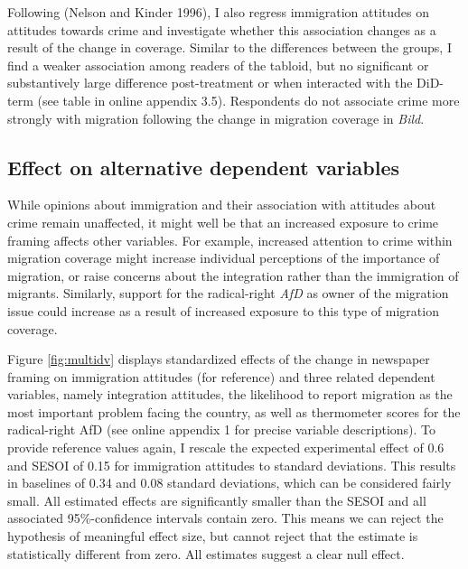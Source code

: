 \documentclass[
  12pt,
]{article}
\begin{document}
Following (Nelson and Kinder 1996), I also regress immigration attitudes on attitudes towards crime and investigate whether this association changes as a result of the change in coverage. Similar to the differences between the groups, I find a weaker association among readers of the tabloid, but no significant or substantively large difference post-treatment or when interacted with the DiD-term (see table in online appendix 3.5). Respondents do not associate crime more strongly with migration following the change in migration coverage in \emph{Bild}.

\hypertarget{effect-on-alternative-dependent-variables}{%
\subsection{Effect on alternative dependent variables}\label{effect-on-alternative-dependent-variables}}

While opinions about immigration and their association with attitudes about crime remain unaffected, it might well be that an increased exposure to crime framing affects other variables. For example, increased attention to crime within migration coverage might increase individual perceptions of the importance of migration, or raise concerns about the integration rather than the immigration of migrants. Similarly, support for the radical-right \emph{AfD} as owner of the migration issue could increase as a result of increased exposure to this type of migration coverage.

Figure \ref{fig:multidv} displays standardized effects of the change in newspaper framing on immigration attitudes (for reference) and three related dependent variables, namely integration attitudes, the likelihood to report migration as the most important problem facing the country, as well as thermometer scores for the radical-right AfD (see online appendix 1 for precise variable descriptions). To provide reference values again, I rescale the expected experimental effect of 0.6 and SESOI of 0.15 for immigration attitudes to standard deviations. This results in baselines of 0.34 and 0.08 standard deviations, which can be considered fairly small. All estimated effects are significantly smaller than the SESOI and all associated 95\%-confidence intervals contain zero. This means we can reject the hypothesis of meaningful effect size, but cannot reject that the estimate is statistically different from zero. All estimates suggest a clear null effect.
\end{document}
